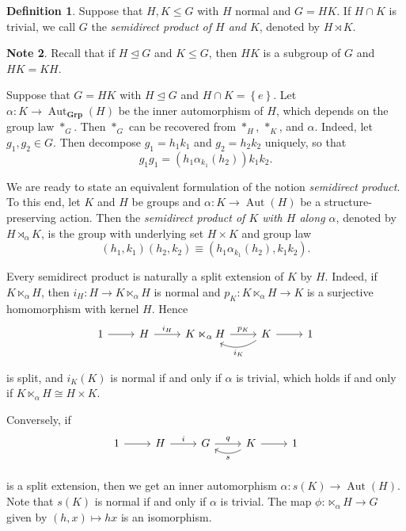 \documentclass[10pt,letterpaper,cm]{nupset}
\theoremstyle{definition}
\newtheorem{definition}{Definition}[subsection]
\newtheorem{note}[definition]{Note}
\theoremstyle{theorem}
\theoremstyle{remark}
\newcommand{\1}{\mathbf{1}}
\newcommand{\0}{\vec 0}
\DeclareMathOperator{\aut}{Aut}
\begin{document}
\begin{definition}
Suppose that $H, K\leq G$ with $H$ normal and $G = HK$. If $H \cap K$ is trivial, we call $G$ the \textit{semidirect product of $H$ and $K$}, denoted by $H \rtimes K$.
\end{definition}


\begin{note}
Recall that if $H \unlhd G$ and $K \leq G$, then $HK$ is a subgroup of $G$ and $HK= KH$.
\end{note}

\medskip

Suppose that $G = HK$ with $H\unlhd G$ and $H \cap K = \left\{e\right\}$. Let $\alpha : K \to \aut_{\mathbf{Grp}}(H)$ be the inner automorphism of $H$, which depends on the group law $*_G$. Then $*_G$ can be recovered from $*_H$, $*_K$, and $\alpha$.
Indeed,
let $g_1, g_2 \in G$. Then decompose $g_1 = h_1k_1$ and $g_2= h_2k_2$ uniquely, so that $$g_1g_1 = \left(h_1\alpha_{k_1}\left(h_2\right)\right)k_1k_2.$$

\medskip

We are ready to state an equivalent formulation of the notion \textit{semidirect product}. To this end,
let $K$ and $H$ be groups and $\alpha : K \to \aut(H)$ be a structure-preserving action. Then the \textit{semidirect product of $K$ with $H$ along $\alpha$}, denoted by $H \rtimes_{\alpha} K$, is the group with underlying set $H \times K$ and group law $$\left(h_1, k_1\right)\left(h_2, k_2\right) \equiv  \left(h_1 \alpha_{k_1}\left(h_2\right), k_1k_2\right).$$

Every semidirect product is naturally a split extension of $K$ by $H$. Indeed, if $K \ltimes_{\alpha} H$, then $i_H : H \to K \ltimes_{\alpha} H$ is normal and $p_K : K\ltimes_{\alpha} H \to K$ is a surjective homomorphism with kernel $H$. Hence \[
	\begin{tikzcd}
	1\rar &H\rar["i_H" above] & K\ltimes_{\alpha} H \rar["p_K" above] & K\rar\lar[bend left=30,"i_K" below] & 1 \\
	\end{tikzcd}
\] is split, and $i_K(K)$ is normal  if and only if $\alpha$ is trivial, which holds if and only if $K \ltimes_{\alpha} H \cong H \times K$.

\smallskip

 Conversely, if 
\[
	\begin{tikzcd}
	1\rar &H\rar["i" above] & G \rar["q" above] & K\rar\lar[bend left=30,"s" below] & 1 \\
	\end{tikzcd}
\]
is a split extension, then we get an inner automorphism $\alpha : s(K) \to \aut(H)$. Note that $s(K)$ is normal if and only if $\alpha$ is trivial. The map $\phi : \ltimes_{\alpha} H \to G$ given by $\left(h,x\right) \mapsto hx$ is an isomorphism.
\end{document}
